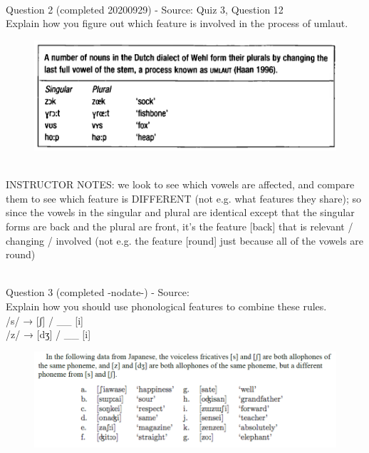 \documentclass[12pt]{article}
\begin{document}
~\\

{\large Question 2} (completed 20200929) - Source: Quiz 3, Question 12\\

Explain how you figure out which feature is involved in the process of umlaut.\\

\begin{figure}[H]
\includegraphics{../images/dutch.png}
\end{figure}

~\\
INSTRUCTOR NOTES: we look to see which vowels are affected, and compare them to see which feature is DIFFERENT (not e.g. what features they share); so since the vowels in the singular and plural are identical except that the singular forms are back and the plural are front, it's the feature [back] that is relevant / changing / involved (not e.g. the feature [round] just because all of the vowels are round)


~\\

{\large Question 3} (completed -nodate-) - Source: \\

Explain how you should use phonological features to combine these rules.\\

/s/ → {[ʃ]} / \_\_ {[i]} \\/z/ → {[dʒ]} / \_\_ {[i]}

\begin{figure}[H]
\includegraphics{../images/japanese.png}
\end{figure}
\end{document}
